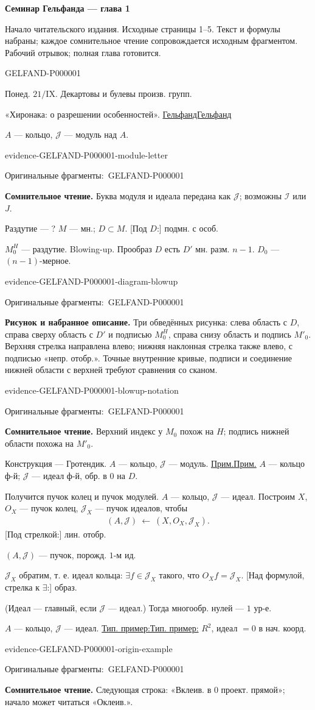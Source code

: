 \documentclass[11pt]{article}
\let\MathUnderline\underline
\renewcommand{\underline}[1]{\ifmmode\MathUnderline{#1}\else\uline{#1}\fi}
\newcommand{\SourcePage}[2]{\par\smallskip\phantomsection\label{#1:source-page}{\small\sffamily\color{blue!55!black}#1}\par\smallskip}
\newcommand{\EvidenceBlock}[4]{%
 \par\smallskip\noindent\begin{minipage}{\linewidth}
 \begin{minipage}[t]{.47\linewidth}\vspace{0pt}\centering
 \csname evidence-#1-#2\endcsname\par
 {\scriptsize\SourceCropCaption\ #1}\par
 \end{minipage}\hfill
 \begin{minipage}[t]{.49\linewidth}\vspace{0pt}\raggedright
 {\small\color{orange!65!black}\textbf{#4} #3}\par
 \end{minipage}
 \end{minipage}\par\smallskip}
\newcommand{\Unclear}[3]{\EvidenceBlock{#1}{#2}{#3}{\ReadingCaption}}
\newcommand{\SourceFigure}[3]{\EvidenceBlock{#1}{#2}{#3}{\DiagramCaption}}
\newcommand{\SourceCropCaption}{Оригинальные фрагменты:}\newcommand{\ReadingCaption}{Сомнительное чтение.}\newcommand{\IncompleteCaption}{Неразобранный фрагмент.}\newcommand{\DiagramCaption}{Рисунок и набранное описание.}
\begin{document}
{\large\bfseries Семинар Гельфанда — глава 1}\par
{\small Начало читательского издания. Исходные страницы 1–5. Текст и формулы набраны; каждое сомнительное чтение сопровождается исходным фрагментом. Рабочий отрывок; полная глава готовится.}\par\medskip
\SourcePage{GELFAND-P000001}{unlabelled}
Понед. $21/\mathrm{IX}$.
Декартовы и булевы произв. групп.

«Хиронака: о разрешении особенностей».
\underline{Гельфанд}

$A$ — кольцо, $\mathcal{J}$ — модуль над $A$.
\Unclear{GELFAND-P000001}{module-letter}{Буква модуля и идеала передана как $\mathcal{J}$; возможны $\mathcal{I}$ или $J$.}

Раздутие — ?
$M$ — мн.; $D\subset M$.
[Под $D$:] подмн. с особ.

$M_0^H$ — раздутие. Blowing-up.
Прообраз $D$ есть $D'$ мн. разм. $n-1$.
$D_0$ — $(n-1)$-мерное.
\SourceFigure{GELFAND-P000001}{diagram-blowup}{Три обведённых рисунка: слева область с $D$, справа сверху область с $D'$ и подписью $M_0^H$, справа снизу область и подпись $M'_0$. Верхняя стрелка направлена влево; нижняя наклонная стрелка также влево, с подписью «непр. отобр.». Точные внутренние кривые, подписи и соединение нижней области с верхней требуют сравнения со сканом.}
\Unclear{GELFAND-P000001}{blowup-notation}{Верхний индекс у $M_0$ похож на $H$; подпись нижней области похожа на $M'_0$.}

Конструкция — Гротендик.
$A$ — кольцо, $\mathcal{J}$ — модуль.
\underline{Прим.} $A$ — кольцо ф-й;
$\mathcal{J}$ — идеал ф-й, обр. в $0$ на $D$.

Получится пучок колец и пучок модулей.
$A$ — кольцо, $\mathcal{J}$ — идеал.
Построим $X$, $O_X$ — пучок колец,
$\mathcal{J}_X$ — пучок идеалов, чтобы
\begin{gather*}
 (A,\mathcal{J})\ \longleftarrow\ (X,O_X,\mathcal{J}_X).
\end{gather*}
[Под стрелкой:] лин. отобр.

$(A,\mathcal{J})$ — пучок, порожд. $1$-м ид.

$\mathcal{J}_X$ обратим, т. е. идеал кольца:
$\exists f\in\mathcal{J}_X$ такого, что $O_Xf=\mathcal{J}_X$.
[Над формулой, стрелка к $\exists$:] образ.

(Идеал — главный, если $\mathcal{J}$ — идеал.)
Тогда многообр. нулей — $1$ ур-е.

$A$ — кольцо, $\mathcal{J}$ — идеал.
\underline{Тип. пример:} $R^2$, идеал $=0$ в нач. коорд.
\Unclear{GELFAND-P000001}{origin-example}{Следующая строка: «Вклеив. в $0$ проект. прямой»; начало может читаться «Оклеив.».}
\end{document}
